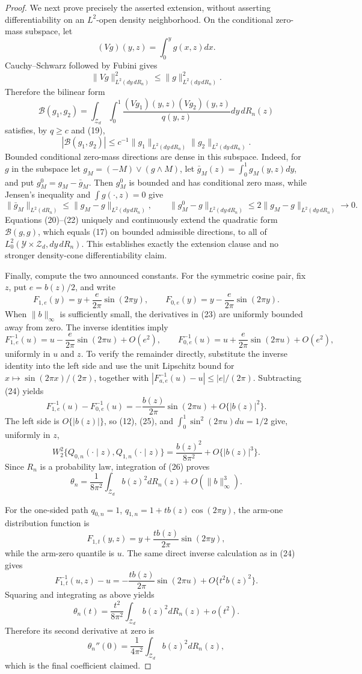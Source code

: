 \documentclass{article}
\begin{document}
\begin{proof}
We next prove precisely the asserted extension, without asserting differentiability on an \(L^2\)-open density neighborhood.  On the conditional zero-mass subspace, let
\[
(Vg)(y,z)=\int_0^yg(x,z)dx.
\tag{18}
\]
Cauchy--Schwarz followed by Fubini gives
\[
\|Vg\|_{L^2(dy\,dR_n)}^2
\le \|g\|_{L^2(dy\,dR_n)}^2.
\tag{19}
\]
Therefore the bilinear form
\[
\mathcal B(g_1,g_2)
=\int_{\mathcal Z_d}\int_0^1
  \frac{(Vg_1)(y,z)(Vg_2)(y,z)}{q(y,z)}dy\,dR_n(z)
\tag{20}
\]
satisfies, by \(q\ge c\) and (19),
\[
|\mathcal B(g_1,g_2)|
\le c^{-1}\|g_1\|_{L^2(dy\,dR_n)}
              \|g_2\|_{L^2(dy\,dR_n)}.
\tag{21}
\]
Bounded conditional zero-mass directions are dense in this subspace.  Indeed, for \(g\) in the subspace let \(g_M=(-M)\vee(g\wedge M)\), let \(\bar g_M(z)=\int_0^1g_M(y,z)dy\), and put \(g_M^0=g_M-\bar g_M\).  Then \(g_M^0\) is bounded and has conditional zero mass, while Jensen's inequality and \(\int g(\cdot,z)=0\) give
\[
\|\bar g_M\|_{L^2(dR_n)}
\le\|g_M-g\|_{L^2(dy\,dR_n)},
\qquad
\|g_M^0-g\|_{L^2(dy\,dR_n)}
\le2\|g_M-g\|_{L^2(dy\,dR_n)}\to0.
\tag{22}
\]
Equations (20)--(22) uniquely and continuously extend the quadratic form \(\mathcal B(g,g)\), which equals (17) on bounded admissible directions, to all of \(L_0^2(\mathcal Y\times\mathcal Z_d,dy\,dR_n)\).  This establishes exactly the extension clause and no stronger density-cone differentiability claim.

Finally, compute the two announced constants.  For the symmetric cosine pair, fix \(z\), put \(e=b(z)/2\), and write
\[
F_{1,e}(y)=y+\frac{e}{2\pi}\sin(2\pi y),
\qquad
F_{0,e}(y)=y-\frac{e}{2\pi}\sin(2\pi y).
\tag{23}
\]
When \(\|b\|_{\infty}\) is sufficiently small, the derivatives in (23) are uniformly bounded away from zero.  The inverse identities imply
\[
F_{1,e}^{-1}(u)
=u-\frac{e}{2\pi}\sin(2\pi u)+O(e^2),
\qquad
F_{0,e}^{-1}(u)
=u+\frac{e}{2\pi}\sin(2\pi u)+O(e^2),
\tag{24}
\]
uniformly in \(u\) and \(z\).  To verify the remainder directly, substitute the inverse identity into the left side and use the unit Lipschitz bound for \(x\mapsto\sin(2\pi x)/(2\pi)\), together with \(|F_{a,e}^{-1}(u)-u|\le |e|/(2\pi)\).  Subtracting (24) yields
\[
F_{1,e}^{-1}(u)-F_{0,e}^{-1}(u)
=-\frac{b(z)}{2\pi}\sin(2\pi u)+O\{|b(z)|^2\}.
\tag{25}
\]
The left side is \(O\{|b(z)|\}\), so (12), (25), and \(\int_0^1\sin^2(2\pi u)du=1/2\) give, uniformly in \(z\),
\[
W_2^2\{Q_{0,n}(\cdot\mid z),Q_{1,n}(\cdot\mid z)\}
=\frac{b(z)^2}{8\pi^2}+O\{|b(z)|^3\}.
\tag{26}
\]
Since \(R_n\) is a probability law, integration of (26) proves
\[
\theta_n
=\frac{1}{8\pi^2}\int_{\mathcal Z_d}b(z)^2dR_n(z)
 +O(\|b\|_{\infty}^3).
\tag{27}
\]

For the one-sided path \(q_{0,n}=1\), \(q_{1,n}=1+t b(z)\cos(2\pi y)\), the arm-one distribution function is
\[
F_{1,t}(y,z)=y+\frac{t b(z)}{2\pi}\sin(2\pi y),
\tag{28}
\]
while the arm-zero quantile is \(u\).  The same direct inverse calculation as in (24) gives
\[
F_{1,t}^{-1}(u,z)-u
=-\frac{t b(z)}{2\pi}\sin(2\pi u)+O\{t^2b(z)^2\}.
\tag{29}
\]
Squaring and integrating as above yields
\[
\theta_n(t)
=\frac{t^2}{8\pi^2}\int_{\mathcal Z_d}b(z)^2dR_n(z)+o(t^2).
\tag{30}
\]
Therefore its second derivative at zero is
\[
\theta_n''(0)=\frac{1}{4\pi^2}
\int_{\mathcal Z_d}b(z)^2dR_n(z),
\tag{31}
\]
which is the final coefficient claimed.
\end{proof}
\end{document}
